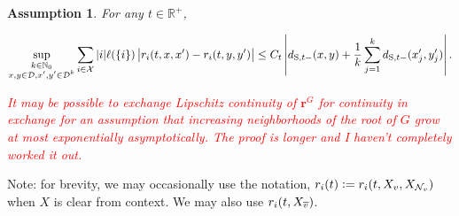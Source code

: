 \documentclass[12pt]{article}
\newcommand{\skipLine}{\vspace{12pt}}
\newcommand{\mb}{\mathbb}
\newcommand{\mc}{\mathcal}
\newcommand{\ov}{\overline}
\newcommand{\te}{\text}
\newcommand{\tr}{\textcolor{red}}
\newcommand{\defeq}{:=}								%
\newcommand{\cad}{\mc{D}}							%
\newcommand{\sta}{\mc{X}}							%
\newcommand{\neigh}[1]{\mc{N}_{#1}}					%
\newcommand{\cl}[1]{\ov{#1}}						%
\newcommand{\Xf}{X}									%
\newcommand{\Sm}{\ell}								%
\newcommand{\rate}{r}								%
\newcommand{\stmet}[1]{
\ifstrempty{#1}{
	d_{\te{S}}}{
	d_{\te{S},#1}}}									%
\newcommand{\xf}{x}									%
\newcommand{\xg}{y}									%
\newcommand{\delt}{\triangle}						%
\newcommand{\vind}[1]{_{#1}}						%
\newcommand{\tme}[1]{(#1)}							%
\newcommand{\gind}[1]{^{#1}}						%
\newcommand{\stpara}[1]{_{#1}}						%
\newcommand{\rateset}{\mathbf{\rate}}				%
\newcommand{\jumpbd}[1]{C_{#1}}						%
\newcommand{\tmepro}[3]{
\ifstrempty{#3}{
	(#1,#2)}{
	(#1,#2,#3)}}									%
\newtheorem{assu}{Assumption}
\begin{document}
\begin{assu}

\item For any \(t \in \mb{R}^+\),

\begin{equation}
\sup_{\substack{k \in \mb{N}_0\\\xf,\xg \in \cad,\xf',\xg'\in \cad^k}} \sum_{i \in \sta}|i|\Sm(\{i\})\left|\rate\stpara{i}\tmepro{t}{\xf}{\xf'} - \rate\stpara{i}\tmepro{t}{\xg}{\xg'}\right| \leq \jumpbd{t}\left|\stmet{t-}(\xf,\xg) + \frac{1}{k}\sum_{j=1}^k \stmet{t-}(\xf'\vind{j},\xg'\vind{j})\right|.
\label{a::xLipschitz}
\end{equation}

\tr{It may be possible to exchange Lipschitz continuity of \(\rateset\gind{G}\) for continuity in exchange for an assumption that increasing neighborhoods of the root of \(G\) grow at most exponentially asymptotically. The proof is longer and I haven't completely worked it out.}
\label{a::liprx}
\end{assu}

%
%
%
%

\skipLine

Note: for brevity, we may occasionally use the notation, \(\rate\stpara{i}\tme{t}\defeq \rate\stpara{i}\tmepro{t}{\Xf\vind{v}}{\Xf\vind{\neigh{v}}}\) when \(\Xf\) is clear from context. We may also use \(\rate\stpara{i}\tmepro{t}{\Xf\vind{\cl{v}}}{}\).
\end{document}
